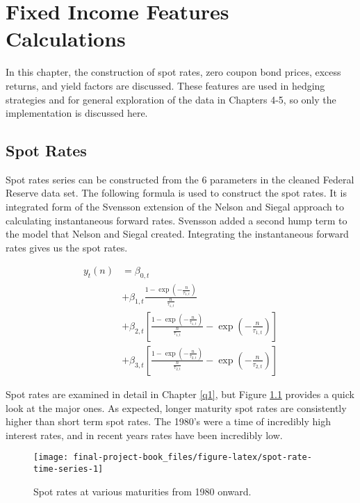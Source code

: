 \documentclass[openany]{book}
\theoremstyle{definition}
\theoremstyle{definition}
\theoremstyle{definition}
\theoremstyle{remark}
\begin{document}
\hypertarget{rates}{%
\chapter{Fixed Income Features Calculations}\label{rates}}

In this chapter, the construction of spot rates, zero coupon bond
prices, excess returns, and yield factors are discussed. These features
are used in hedging strategies and for general exploration of the data
in Chapters 4-5, so only the implementation is discussed here.

\small

\normalsize

\hypertarget{spot-rates}{%
\section{Spot Rates}\label{spot-rates}}

Spot rates series can be constructed from the 6 parameters in the
cleaned Federal Reserve data set. The following formula is used to
construct the spot rates. It is integrated form of the Svensson
extension of the Nelson and Siegal approach to calculating instantaneous
forward rates. Svensson added a second hump term to the model that
Nelson and Siegal created. Integrating the instantaneous forward rates
gives us the spot rates.

\[
\begin{aligned}
  y_t(n) &= \beta_{0,t} \\
   &+ \beta_{1,t} \frac{1 - \exp(- \frac{n}{\tau_{1,t}})}{\frac{n}{\tau_{1,t}}} \\
   &+ \beta_{2,t} [\frac{1 - \exp(- \frac{n}{\tau_{1,t}})}{\frac{n}{\tau_{1,t}}} - \exp(-\frac{n}{\tau_{1,t}})] \\
   &+ \beta_{3,t} [\frac{1 - \exp(- \frac{n}{\tau_{2,t}})}{\frac{n}{\tau_{2,t}}} - \exp(-\frac{n}{\tau_{2,t}})]
\end{aligned}
\]

Spot rates are examined in detail in Chapter \ref{q1}, but Figure
\ref{fig:spot-rate-time-series} provides a quick look at the major ones.
As expected, longer maturity spot rates are consistently higher than
short term spot rates. The 1980's were a time of incredibly high
interest rates, and in recent years rates have been incredibly low.

\small

\begin{figure}[H]

{\centering \texttt{[image: final-project-book\_files/figure-latex/spot-rate-time-series-1]} 

}

\caption{Spot rates at various maturities from 1980 onward.}\label{fig:spot-rate-time-series}
\end{figure}
\end{document}
